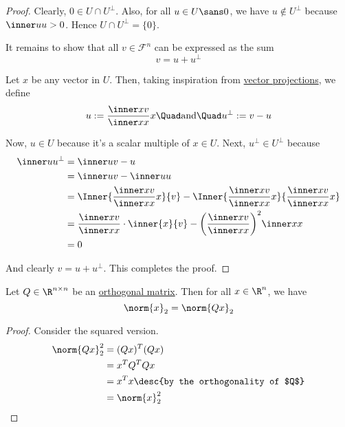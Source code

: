 \begin{proof}
  \def\F{\mathcal F}
  \def\U{U^\perp}
  \def\u{u^\perp}

  Clearly, $0\in U\cap\U$. Also, for all $u\in U\sans0$, we have $u\notin\U$
  because $\inner uu>0$. Hence $U\cap\U=\{0\}$.

  It remains to show that all $v\in\F^n$ can be expressed as the sum
  $$
    v=u+\u
  $$

  Let $x$ be any vector in $U$. Then, taking inspiration from
  \href{fc332ef}{vector projections}, we define
  $$
    u:=\frac{\inner xv}{\inner xx}x\Quad\text{and}\Quad\u:=v-u
  $$

  Now, $u\in U$ because it's a scalar multiple of $x\in U$. Next, $\u\in\U$
  because
  \begin{align*}
    \inner u\u
     &=\inner u{v-u}                                                                                              \\
     &=\inner uv-\inner uu                                                                                        \\
     &=\Inner{\frac{\inner xv}{\inner xx}x}{v}-\Inner{\frac{\inner xv}{\inner xx}x}{\frac{\inner xv}{\inner xx}x} \\
     &=\frac{\inner xv}{\inner xx}\cdot\inner{x}{v}-\biggl(\frac{\inner xv}{\inner xx}\biggr)^2\inner xx          \\
     &=0
  \end{align*}

  And clearly $v=u+\u$. This completes the proof.
\end{proof}

\label{eaec5b1}

Let $Q\in\R^{n\times n}$ be an \href{c38c9d1}{orthogonal matrix}. Then for all
$x\in\R^n$, we have
$$
  \norm{x}_2=\norm{Qx}_2
$$

\begin{proof}
  Consider the squared version.
  \begin{align*}
    \norm{Qx}_2^2 &=(Qx)^T(Qx)                             \\
                  &=x^TQ^TQx                               \\
                  &=x^Tx\desc{by the orthogonality of $Q$} \\
                  &=\norm{x}_2^2
  \end{align*}
\end{proof}

